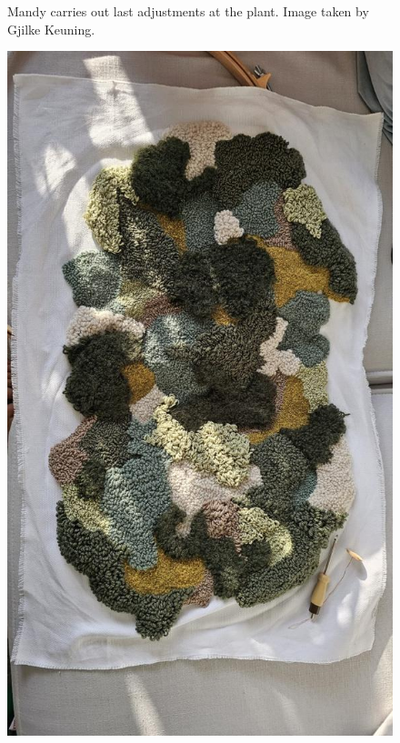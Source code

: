 \documentclass[authordate, empirical]{jote-new-article}
\begin{document}
{\begin{figure}
		\caption{Mandy carries out last adjustments at the plant. Image taken by Gjilke Keuning.}



	\end{figure}









	\begin{figure}
		\includegraphics[width=\linewidth]{media/fig3.jpeg}


\end{figure}}
\end{document}
